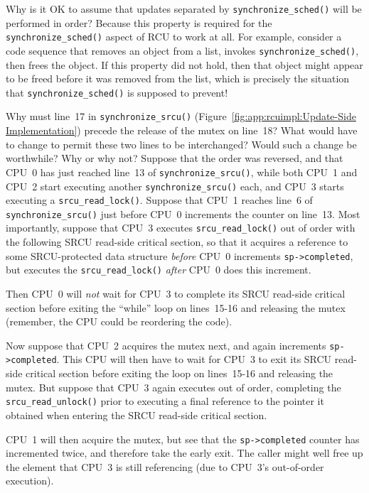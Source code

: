 \QuickQ{}
	Why is it OK to assume that updates separated by
	{\tt synchronize\_sched()} will be performed in order?
\QuickA{}
	Because this property is required for the {\tt synchronize\_sched()}
	aspect of RCU to work at all.
	For example, consider a code sequence that removes an object
	from a list, invokes {\tt synchronize\_sched()}, then frees
	the object.
	If this property did not hold, then that object might appear
	to be freed before it was
	removed from the list, which is precisely the situation that
	{\tt synchronize\_sched()} is supposed to prevent!

\QuickQ{}
	Why must line~17 in {\tt synchronize\_srcu()}
	(Figure~\ref{fig:app:rcuimpl:Update-Side Implementation})
	precede the release of the mutex on line~18?
	What would have to change to permit these two lines to be
	interchanged?
	Would such a change be worthwhile?
	Why or why not?
\QuickA{}
	Suppose that the order was reversed, and that CPU~0
	has just reached line~13 of
	{\tt synchronize\_srcu()}, while both CPU~1 and CPU~2 start executing
	another {\tt synchronize\_srcu()} each, and CPU~3 starts executing a
	{\tt srcu\_read\_lock()}.
	Suppose that CPU~1 reaches line~6 of {\tt synchronize\_srcu()}
	just before CPU~0 increments the counter on line~13.
	Most importantly, suppose that
	CPU~3 executes {\tt srcu\_read\_lock()}
	out of order with the following SRCU read-side critical section,
	so that it acquires a reference to some SRCU-protected data
	structure \emph{before} CPU~0 increments {\tt sp->completed}, but
	executes the {\tt srcu\_read\_lock()} \emph{after} CPU~0 does
	this increment.
	
	Then CPU~0 will \emph{not} wait for CPU~3 to complete its
	SRCU read-side critical section before exiting the ``while''
	loop on lines~15-16 and releasing the mutex (remember, the
	CPU could be reordering the code).
	
	Now suppose that CPU~2 acquires the mutex next,
	and again increments {\tt sp->completed}.
	This CPU will then have to wait for CPU~3 to exit its SRCU
	read-side critical section before exiting the loop on
	lines~15-16 and releasing the mutex.
	But suppose that CPU~3 again executes out of order,
	completing the {\tt srcu\_read\_unlock()} prior to
	executing a final reference to the pointer it obtained
	when entering the SRCU read-side critical section.

	CPU~1 will then acquire the mutex, but see that the
	{\tt sp->completed} counter has incremented twice, and
	therefore take the early exit.
	The caller might well free up the element that CPU~3 is
	still referencing (due to CPU~3's out-of-order execution).

